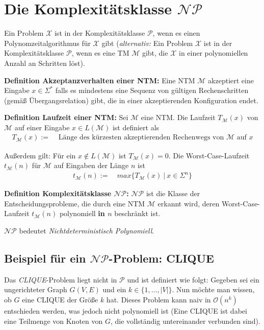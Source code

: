 \documentclass{scrartcl}%
\begin{document}

    \section*{Die Komplexitätsklasse $\mathcal{N}\mathcal{P}$}
    Ein Problem $\mathcal{X}$ ist in der Komplexitätsklasse $\mathcal{P}$,
    wenn es einen Polynomzeitalgorithmus für $\mathcal{X}$ gibt
    (\textit{alternativ:} Ein Problem $\mathcal{X}$ ist in der Komplexitätsklasse $\mathcal{P}$,
    wenn es eine TM $\mathcal{M}$ gibt, die $\mathcal{X}$ in einer polynomiellen Anzahl an Schritten löst).

    \vspace*{0.3cm}
    \textbf{\textsf{Definition Akzeptanzverhalten einer NTM:}}
    Eine NTM $\mathcal{M}$ akzeptiert eine Eingabe $x \in \Sigma^*$
    falls es mindestens eine Sequenz von gültigen Rechenschritten (gemäß Übergangsrelation) gibt,
    die in einer akzeptierenden Konfiguration endet.

    \vspace*{0.3cm}
    \textbf{\textsf{Definition Laufzeit einer NTM:}}
    Sei $\mathcal{M}$ eine NTM. Die Laufzeit $T_{\mathcal{M}}(x)$ von $\mathcal{M}$ auf einer Eingabe $x \in L(\mathcal{M})$ ist definiert als
    \begin{align*}
        T_{\mathcal{M}}(x) := & \text{ Länge des kürzesten akzeptierenden Rechenwegs von } \mathcal{M} \text{ auf } x
    \end{align*}

    Außerdem gilt: Für ein $x \notin L(\mathcal{M})$ ist $T_{\mathcal{M}}(x) = 0$. Die Worst-Case-Laufzeit
    $t_{\mathcal{M}}(n)$ für $\mathcal{M}$ auf Eingaben der Länge $n$ ist
    \begin{align*}
        t_{\mathcal{M}}(n) := &\ max\{T_{\mathcal{M}}(x)\ |\ x\in \Sigma^n \}
    \end{align*}

    \vspace*{0.3cm}
    \textbf{\textsf{Definition Komplexitätsklasse $\mathcal{N}\mathcal{P}$:}}
    $\mathcal{N}\mathcal{P}$ ist die Klasse der Entscheidungsprobleme, die durch eine NTM $\mathcal{M}$ erkannt wird,
    deren Worst-Case-Laufzeit $t_{\mathcal{M}}(n)$ polynomiell \textbf{in $n$} beschränkt ist.

    $\mathcal{N}\mathcal{P}$ bedeutet \textit{Nichtdeterministisch Polynomiell}.

    \subsection*{Beispiel für ein $\mathcal{N}\mathcal{P}$-Problem: CLIQUE}
    Das \textit{CLIQUE}-Problem liegt nicht in $\mathcal{P}$ und ist definiert wie folgt:
    Gegeben sei ein ungerichteter Graph $G(V,E)$ und ein $k \in {\{1, \dots, |V|\}}$.
    Nun möchte man wissen, ob $G$ eine CLIQUE der Größe $k$ hat.
    Dieses Problem kann naiv in $\mathcal{O}(n^k)$ entschieden werden, was jedoch nicht polynomiell ist
    (Eine CLIQUE ist dabei eine Teilmenge von Knoten von $G$, die vollständig untereinander verbunden sind).
\end{document}

